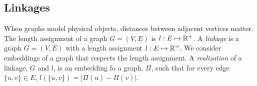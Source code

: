 \subsection{Linkages}


When graphs model physical objects, distances between adjacent vertices matter. The length 
assignment of a graph $G=(V,E)$ is $l:E \mapsto {\mathbb{R}}^+$. A \textit{linkage} is a graph $G = 
(V,E)$ with a length assignment $l:E \mapsto {\mathbb{R}}^+$.  We consider embeddings of a graph that 
respects the length assignment.  A \textit{realization} of a linkage, $G$ and $l$, is an embedding 
fo a graph, $\Pi$, such that for every edge $\{u,v\} \in E$, $l\left( \{u,v\} \right) 
= \left\vert \Pi(u) - \Pi(v) \right\vert$.




